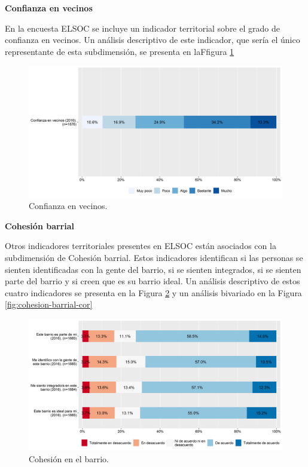 \documentclass[
  12pt,
]{book}
\begin{document}
\textbf{Confianza en vecinos}

En la encuesta ELSOC se incluye un indicador territorial sobre el grado de confianza en vecinos. Un análisis descriptivo de este indicador, que sería el único representante de esta subdimensión, se presenta en laFfigura \ref{fig:confianza-vecinos}

\begin{figure}[H]

{\centering \includegraphics[width=1\linewidth,height=1\textheight]{output/graphs/confianza-vecinos} 

}

\caption{Confianza en vecinos.}\label{fig:confianza-vecinos}
\end{figure}

\textbf{Cohesión barrial}

Otros indicadores territoriales presentes en ELSOC están asociados con la subdimensión de Cohesión barrial. Estos indicadores identifican si las personas se sienten identificadas con la gente del barrio, si se sienten integrados, si se sienten parte del barrio y si creen que es su barrio ideal. Un análisis descriptivo de estos cuatro indicadores se presenta en la Figura \ref{fig:cohesion-barrial} y un análisis bivariado en la Figura \ref{fig:cohesion-barrial-cor}

\begin{figure}[H]

{\centering \includegraphics[width=1\linewidth,height=1\textheight]{output/graphs/cohesion-barrial} 

}

\caption{Cohesión en el barrio.}\label{fig:cohesion-barrial}
\end{figure}
\end{document}
